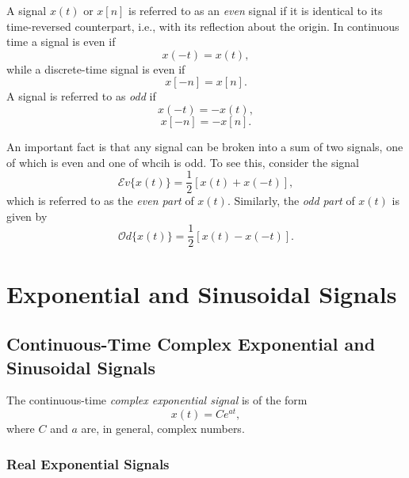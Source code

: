 \documentclass[a4paper,10pt,twoside]{book}
\begin{document}
A signal $x(t)$ or $x[n]$ is referred to as an \textit{even} signal if it is identical to its time-reversed counterpart, i.e., with its reflection about the origin. In continuous time a signal is even if
\begin{equation}
    x(-t)=x(t),
    \label{1.14}
\end{equation}
while a discrete-time signal is even if
\begin{equation}
    x[-n]=x[n].
    \label{1.15}
\end{equation}
A signal is referred to as \textit{odd} if
\begin{equation}
    x(-t)=-x(t),
    \label{1.16}
\end{equation}
\begin{equation}
    x[-n]=-x[n].
    \label{1.17}
\end{equation}

An important fact is that any signal can be broken into a sum of two signals, one of which is even and one of whcih is odd. To see this, consider the signal
\begin{equation}
    \mathcal{E}v\{x(t)\}=\dfrac{1}{2}[x(t)+x(-t)],
    \label{1.18}
\end{equation}
which is referred to as the \textit{even part} of $x(t)$. Similarly, the \textit{odd part} of $x(t)$ is given by
\begin{equation}
    \mathcal{O}d\{x(t)\}=\dfrac{1}{2}[x(t)-x(-t)].
    \label{1.19}
\end{equation}

\section{Exponential and Sinusoidal Signals}
\subsection{Continuous-Time Complex Exponential and Sinusoidal Signals}

The continuous-time \textit{complex exponential signal} is of the form
\begin{equation}
    x(t)=Ce^{at},
    \label{1.20}
\end{equation}
where $C$ and $a$ are, in general, complex numbers.

\subsubsection{Real Exponential Signals}
\end{document}
